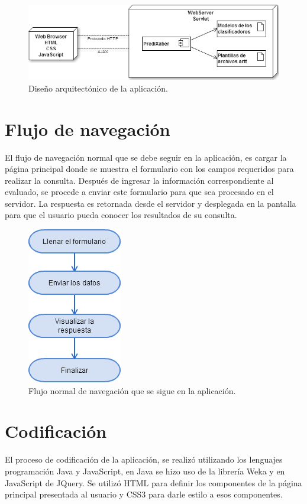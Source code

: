 \begin{figure}[!htb]
\begin{centering}
\includegraphics[scale=0.65]{package}
\par\end{centering}
\caption{Diseño arquitectónico de la aplicación.}
\label{fig:figura3}
\end{figure}
\section{Flujo de navegación}
El flujo de navegación normal que se debe seguir en la aplicación, es cargar la página principal donde se muestra el formulario con los campos requeridos para realizar la consulta. Después de  ingresar la información correspondiente al evaluado, se procede a enviar este formulario para que sea procesado en el servidor. La respuesta es retornada desde el servidor y desplegada en la pantalla para que el usuario pueda conocer los resultados de su consulta.

\begin{figure}[!htb]
\begin{centering}
\includegraphics[scale=0.65]{Flowchart}
\par\end{centering}
\caption{Flujo normal de navegación que se sigue en la aplicación.}
\label{fig:figura4}
\end{figure}
\section{Codificación}
El proceso de codificación de la aplicación, se realizó utilizando los lenguajes programación Java y JavaScript, en Java se hizo uso de la librería Weka y en JavaScript de JQuery. Se utilizó HTML para definir los componentes de la página principal presentada al usuario y CSS3 para darle estilo a esos componentes.

